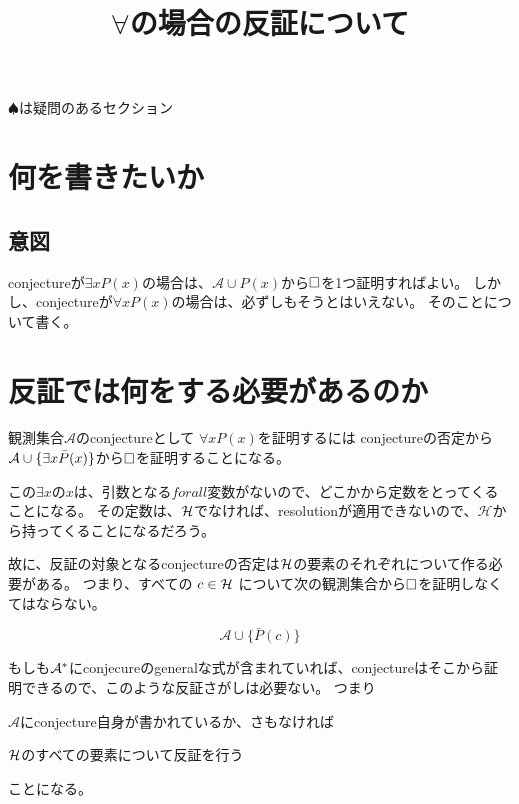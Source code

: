 \documentclass[10pt, oneside]{jarticle}   	%
\title{$\forall$の場合の反証について}
\author{\myname}
\begin{document}
\maketitle
\tableofcontents
$\spadesuit$は疑問のあるセクション
\newpage

\section{何を書きたいか}
\subsection{意図}
conjectureが$\exists x P(x)$の場合は、$\mathcal{A} \cup P(x)$から$\Box$を1つ証明すればよい。
しかし、conjectureが$\forall x P(x)$の場合は、必ずしもそうとはいえない。
そのことについて書く。



\newpage

\section{反証では何をする必要があるのか}
観測集合$\mathcal{A}$のconjectureとして $\forall x P(x)$を証明するには
conjectureの否定から $\mathcal{A} \cup \{{\exists x \bar{P}(x)}\}$から$\Box$を証明することになる。

この$\exists x$の$x$は、引数となる$forall $変数がないので、どこかから定数をとってくることになる。
その定数は、$\mathcal{H}$でなければ、resolutionが適用できないので、$\mathcal{H}$から持ってくることになるだろう。

故に、反証の対象となるconjectureの否定は$\mathcal{H}$の要素のそれぞれについて作る必要がある。
つまり、すべての $ c \in \mathcal{H}$ について次の観測集合から$\Box$を証明しなくてはならない。

\begin{equation}
 \mathcal{A} \cup \{ \bar{P}(c) \} 
\end{equation}

もしも$\mathcal{A}^{*}$にconjecureのgeneralな式が含まれていれば、conjectureはそこから証明できるので、このような反証さがしは必要ない。
つまり

\begin{description}
\item $\mathcal{A}$にconjecture自身が書かれているか、さもなければ
\item $\mathcal{H}$のすべての要素について反証を行う
\end{description}

ことになる。
\end{document}
